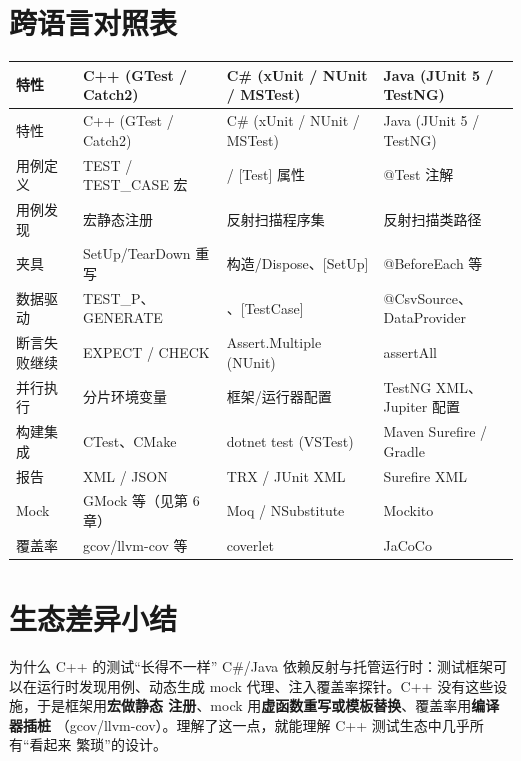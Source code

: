\documentclass[12pt,a4paper,fontset=fandol]{ctexbook}
\begin{document}
\section{跨语言对照表}

{
\scriptsize
\setlength{\tabcolsep}{3pt}
\begin{longtable}{>{\raggedright\arraybackslash}p{2.8cm}>{\raggedright\arraybackslash}p{3.9cm}>{\raggedright\arraybackslash}p{3.9cm}>{\raggedright\arraybackslash}p{3.2cm}}
\toprule
特性 & C++ (GTest / Catch2) & C\# (xUnit / NUnit / MSTest) & Java (JUnit 5 / TestNG) \\
\midrule
\endfirsthead
\toprule
特性 & C++ (GTest / Catch2) & C\# (xUnit / NUnit / MSTest) & Java (JUnit 5 / TestNG) \\
\midrule
\endhead
用例定义 & TEST / TEST\_CASE 宏 & [Fact] / [Test] 属性 & @Test 注解 \\
用例发现 & 宏静态注册 & 反射扫描程序集 & 反射扫描类路径 \\
夹具 & SetUp/TearDown 重写 & 构造/Dispose、[SetUp] & @BeforeEach 等 \\
数据驱动 & TEST\_P、GENERATE & [Theory]、[TestCase] & @CsvSource、DataProvider \\
断言失败继续 & EXPECT / CHECK & Assert.\allowbreak{}Multiple (NUnit) & assertAll \\
并行执行 & 分片环境变量 & 框架/运行器配置 & TestNG XML、Jupiter 配置 \\
构建集成 & CTest、CMake & dotnet test (VSTest) & Maven Surefire / Gradle \\
报告 & XML / JSON & TRX / JUnit XML & Surefire XML \\
Mock & GMock 等（见第 6 章） & Moq / NSubstitute & Mockito \\
覆盖率 & gcov/llvm-cov 等 & coverlet & JaCoCo \\
\bottomrule
\end{longtable}
}

\section{生态差异小结}

\begin{compare}{为什么 C++ 的测试“长得不一样”}
C\#/Java 依赖反射与托管运行时：测试框架可以在运行时发现用例、动态生成
mock 代理、注入覆盖率探针。C++ 没有这些设施，于是框架用\textbf{宏做静态
注册}、mock 用\textbf{虚函数重写或模板替换}、覆盖率用\textbf{编译器插桩}
（gcov/llvm-cov）。理解了这一点，就能理解 C++ 测试生态中几乎所有“看起来
繁琐”的设计。
\end{compare}
\end{document}
